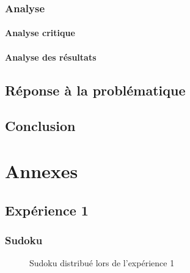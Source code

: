 \documentclass[12pt,fleqn,oneside,openany]{book} %
\begin{document}
\subsection{Analyse} \label{ssec:analyse2.2}

\subsubsection{Analyse critique} \label{sssec:analyseCrit2.2}

\subsubsection{Analyse des résultats} \label{sssec:analyseResult2.2}

\newpage
\section{Réponse à la problématique} \label{sec:reponseProb}

\newpage
\section{Conclusion} \label{sec:conclusion}




\appendix
\chapter{Annexes} \label{cha:annexes}
\section*{Expérience 1}

\subsection*{Sudoku} \label{sec:Sudoku}
\begin{figure}[htp]  %
	\caption{Sudoku distribué lors de l'expérience 1}
\end{figure}  
\end{document}

